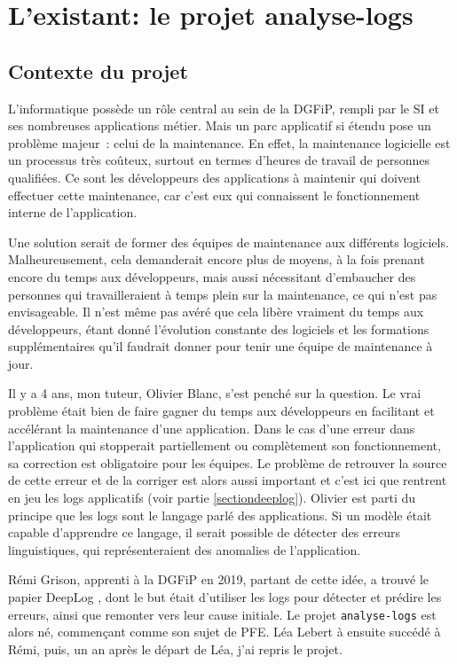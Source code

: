\documentclass[openany, 11pt]{memoir}
\begin{document}
\newpage
\chapter{L'existant: le projet analyse-logs}

\section{Contexte du projet}


L'informatique possède un rôle central au sein de la \gls{DGFiP}, rempli par le \gls{SI} et ses nombreuses applications métier. Mais un parc applicatif si étendu pose un problème majeur~: celui de la maintenance. En effet, la maintenance logicielle est un processus très coûteux, surtout en termes d'heures de travail de personnes qualifiées. Ce sont les développeurs des applications à maintenir qui doivent effectuer cette maintenance, car c'est eux qui connaissent le fonctionnement interne de l'application.

Une solution serait de former des équipes de maintenance aux différents logiciels. Malheureusement, cela demanderait encore plus de moyens, à la fois prenant encore du temps aux développeurs, mais aussi nécessitant d'embaucher des personnes qui travailleraient à temps plein sur la maintenance, ce qui n'est pas envisageable. Il n'est même pas avéré que cela libère vraiment du temps aux développeurs, étant donné l'évolution constante des logiciels et les formations supplémentaires qu'il faudrait donner pour tenir une équipe de maintenance à jour.

\bigskip
Il y a 4 ans, mon tuteur, Olivier Blanc, s'est penché sur la question. Le vrai problème était bien de faire gagner du temps aux développeurs en facilitant et accélérant la maintenance d'une application. Dans le cas d'une erreur dans l'application qui stopperait partiellement ou complètement son fonctionnement, sa correction est obligatoire pour les équipes. Le problème de retrouver la source de cette erreur et de la corriger est alors aussi important et c'est ici que rentrent en jeu les \glspl{log} applicatifs (voir partie \ref{sectiondeeplog}). Olivier est parti du principe que les logs sont le langage parlé des applications. Si un modèle était capable d'apprendre ce langage, il serait possible de détecter des erreurs linguistiques, qui représenteraient des anomalies de l'application.

Rémi Grison, apprenti à la DGFiP en 2019, partant de cette idée, a trouvé le papier DeepLog \cite{deeplog}, dont le but était d'utiliser les logs pour détecter et prédire les erreurs, ainsi que remonter vers leur cause initiale. Le projet \texttt{analyse-logs} est alors né, commençant comme son sujet de PFE. Léa Lebert à ensuite succédé à Rémi, puis, un an après le départ de Léa, j'ai repris le projet.
\end{document}
